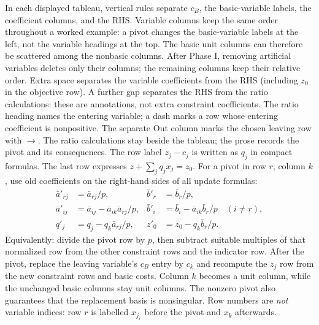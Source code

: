 \documentclass[11pt,a4paper]{article}
\begin{document}
In each displayed tableau, vertical rules separate $c_B$, the basic-variable
labels, the coefficient columns, and the RHS. Variable columns keep the same
order throughout a worked example: a pivot changes the basic-variable labels
at the left, not the variable headings at the top. The basic unit columns
can therefore be scattered among the nonbasic columns. After Phase I,
removing artificial variables deletes only their columns; the remaining
columns keep their relative order. Extra space separates the variable
coefficients from the RHS (including $z_0$ in the objective row).
A further gap separates the RHS from the ratio calculations: these are
annotations, not extra constraint coefficients. The ratio heading names the
entering variable; a dash marks a row whose entering coefficient is nonpositive.
The separate Out column marks the chosen leaving row with $\longrightarrow$.
The ratio calculations stay beside the tableau; the prose records the pivot
and its consequences. The row label $z_j-c_j$ is written as $q_j$ in compact
formulas. The last row expresses
$z+\sum_jq_jx_j=z_0$. For a pivot in row $r$, column $k$, use old coefficients
on the right-hand sides of all update formulas:
\begin{align*}
  \bar a'_{rj}&=\bar a_{rj}/p,& \bar b'_r&=\bar b_r/p,\\
  \bar a'_{ij}&=\bar a_{ij}-\bar a_{ik}\bar a_{rj}/p,&
  \bar b'_i&=\bar b_i-\bar a_{ik}\bar b_r/p\quad(i\ne r),\\
  q'_j&=q_j-q_k\bar a_{rj}/p,& z'_0&=z_0-q_k\bar b_r/p.
\end{align*}
Equivalently: divide the pivot row by $p$, then subtract suitable multiples of
that normalized row from the other constraint rows and the indicator row.
After the pivot, replace the leaving variable's $c_B$ entry by $c_k$ and
recompute the $z_j$ row from the new constraint rows and basic costs.
Column $k$ becomes a unit column, while the unchanged basic columns stay unit
columns. The nonzero pivot also guarantees that the replacement basis is
nonsingular. Row numbers are \emph{not} variable indices: row $r$ is labelled
$x_{j_r}$ before the pivot and $x_k$ afterwards.

\Needspace{20cm}
\end{document}
